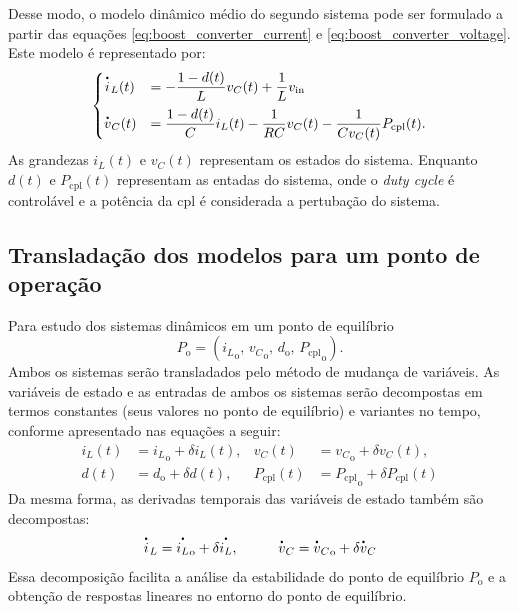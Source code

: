 Desse modo, o modelo dinâmico médio do segundo sistema pode ser formulado a partir das equações \eqref{eq:boost_converter_current} e \eqref{eq:boost_converter_voltage}. Este modelo é representado por: \begin{equation} \begin{cases} \dt{i}_L(t) &= \displaystyle - \frac{1-d(t)}{L}v_C(t) + \frac{1}{L}v_{\mathrm{in}} \\[8pt] \dt{v}_C(t) &= \displaystyle \frac{1 - d(t)}{C} i_L(t) - \frac{1}{RC}v_C(t) - \frac{1}{Cv_C(t)}P_{\mathrm{cpl}}(t). \label{eq:boost_nonlinear_system}\end{cases} \end{equation} As grandezas $i_L(t)$ e $v_C(t)$ representam os estados do sistema. Enquanto $d(t)$ e $P_{\mathrm{cpl}}(t)$ representam as entadas do sistema, onde o \textit{duty cycle }é controlável e a potência da \acrshort{cpl} é considerada a pertubação do sistema.

\subsection{Transladação dos modelos para um ponto de operação}

Para estudo dos sistemas dinâmicos em um ponto de equilíbrio \begin{equation} P_{\mathrm{o}} = \left({i_L}_{\mathrm{o}}, \, {v_C}_{\mathrm{o}}, \, d_{\mathrm{o}}, \, {P_{\mathrm{cpl}}}_{\mathrm{o}} \right). \label{eq:operation_point} \end{equation} Ambos os sistemas serão transladados pelo método de mudança de variáveis. As variáveis de estado e as entradas de ambos os sistemas serão decompostas em termos constantes (seus valores no ponto de equilíbrio) e variantes no tempo, conforme apresentado nas equações a seguir: \begin{align}
  {i_L}(t) & = {i_L}_{\mathrm{o}} + \delta i_L(t), & {v_C}(t)     & = {v_C}_{\mathrm{o}} + \delta v_C(t), \label{eq:tranlation_decomposed_states}        \\[8pt]
  {d}(t)   & = d_{\mathrm{o}} + \delta d(t),       & {P_{\mathrm{cpl}}}(t) & = {P_{\mathrm{cpl}}}_{\mathrm{o}} + \delta P_{\mathrm{cpl}}(t) \label{eq:tranlation_decomposed_inputs}
\end{align} Da mesma forma, as derivadas temporais das variáveis de estado também são decompostas: \begin{align}
  \dt{i}_L = {\dt{i_L}}_{\mathrm{o}} + \delta \dt{i_L}, \hspace{1cm}
  \dt{v}_C = {\dt{v}_C}_{\mathrm{o}} + \delta \dt{v}_C
\end{align} Essa decomposição facilita a análise da estabilidade do ponto de equilíbrio $P_{\mathrm{o}}$ e a obtenção de respostas lineares no entorno do ponto de equilíbrio.

